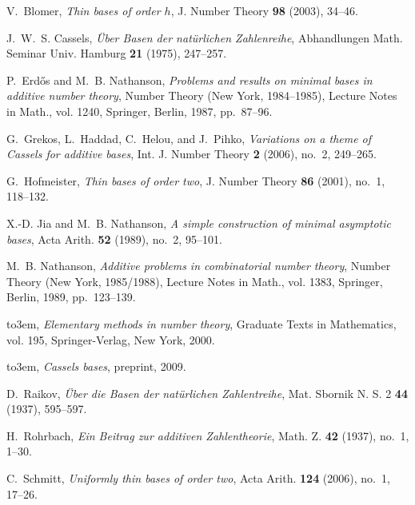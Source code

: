 \documentclass{amsart}
\begin{document}
  
\providecommand{\bysame}{\leavevmode\hbox to3em{\hrulefill}\thinspace}
\providecommand{\MR}{\relax\ifhmode\unskip\space\fi MR }
\providecommand{\MRhref}[2]{  \href{http://www.ams.org/mathscinet-getitem?mr=#1}{#2}
}
\providecommand{\href}[2]{#2}
\begin{thebibliography}{10}

V.~Blomer, \emph{Thin bases of order {$h$}}, J. Number Theory \textbf{98}
  (2003), 34--46.

J.~W.~S. Cassels, \emph{{\" U}ber {B}asen der nat{\" u}rlichen {Z}ahlenreihe},
  Abhandlungen Math. Seminar Univ. Hamburg \textbf{21} (1975), 247--257.

P.~Erd{\H{o}}s and M.~B. Nathanson, \emph{Problems and results on minimal bases
  in additive number theory}, {Number Theory (New York, 1984--1985)}, Lecture
  Notes in Math., vol. 1240, Springer, Berlin, 1987, pp.~87--96.

G.~Grekos, L.~Haddad, C.~Helou, and J.~Pihko, \emph{Variations on a theme of
  {C}assels for additive bases}, Int. J. Number Theory \textbf{2} (2006),
  no.~2, 249--265.

G.~Hofmeister, \emph{Thin bases of order two}, J. Number Theory \textbf{86}
  (2001), no.~1, 118--132.

X.-D. Jia and M.~B. Nathanson, \emph{A simple construction of minimal
  asymptotic bases}, Acta Arith. \textbf{52} (1989), no.~2, 95--101.

M.~B. Nathanson, \emph{Additive problems in combinatorial number theory},
  {Number Theory (New York, 1985/1988)}, Lecture Notes in Math., vol. 1383,
  Springer, Berlin, 1989, pp.~123--139.

\bysame, \emph{Elementary methods in number theory}, Graduate Texts in
  Mathematics, vol. 195, Springer-Verlag, New York, 2000.

\bysame, \emph{Cassels bases}, preprint, 2009.

D.~Raikov, \emph{{\" U}ber die {B}asen der nat{\" u}rlichen {Z}ahlentreihe},
  Mat. Sbornik N. S. 2 \textbf{44} (1937), 595--597.

H.~Rohrbach, \emph{Ein {B}eitrag zur additiven {Z}ahlentheorie}, Math. Z.
  \textbf{42} (1937), no.~1, 1--30.

C.~Schmitt, \emph{Uniformly thin bases of order two}, Acta Arith. \textbf{124}
  (2006), no.~1, 17--26.


\end{thebibliography}
\end{document}
